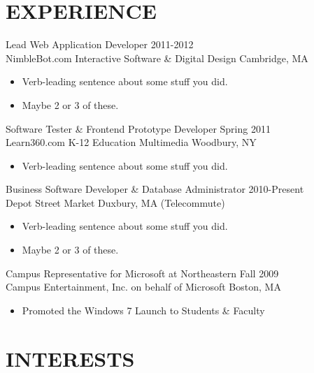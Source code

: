 \documentclass[line,margin]{res}
\begin{document}
\begin{resume}
\section{EXPERIENCE}
                {\large Lead Web Application Developer} \hfill 2011-2012 \\
                NimbleBot.com Interactive Software \& Digital Design 
                \hfill Cambridge, MA
                 \begin{itemize}  \itemsep -2pt %
                 \item Verb-leading sentence about some stuff you did.
                 \item Maybe 2 or 3 of these.
                \end{itemize}

                {\large Software Tester \& Frontend Prototype Developer}
                \hfill Spring 2011 \\
                Learn360.com K-12 Education Multimedia \hfill Woodbury, NY
                 \begin{itemize}  \itemsep -2pt %
                 \item Verb-leading sentence about some stuff you did.
                \end{itemize}

                {\large Business Software Developer \& Database Administrator}
                \hfill 2010-Present \\
                Depot Street Market \hfill Duxbury, MA {\footnotesize (Telecommute)}
                 \begin{itemize}  \itemsep -2pt %
                 \item Verb-leading sentence about some stuff you did.
                 \item Maybe 2 or 3 of these.
                \end{itemize}

                {\large Campus Representative for Microsoft at Northeastern}
                \hfill Fall 2009 \\
                Campus Entertainment, Inc. on behalf of Microsoft \hfill Boston, MA
                 \begin{itemize}  \itemsep -2pt %
                 \item Promoted the Windows 7 Launch to Students \& Faculty
                \end{itemize}

\section{INTERESTS}
                
 

\end{resume}
\end{document}
